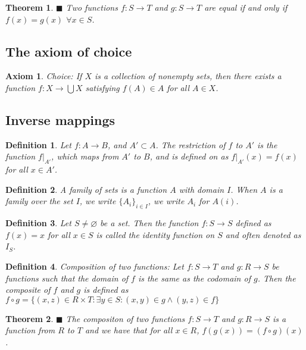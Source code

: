 \documentclass[a4paper]{article}
\newtheorem{mytheorem}{Theorem}
\newtheorem{axiom}{Axiom}
\newtheorem{mydef}{Definition}
\numberwithin{mytheorem}{section}
\numberwithin{mydef}{section}
\numberwithin{axiom}{section}
\numberwithin{example}{section}
\newcommand{\done}{$\blacksquare$ }
\begin{document}
\begin{mytheorem} \done Two functions $f: S \rightarrow T$ and $g: S \rightarrow T$ are equal if and only if $f(x) = g(x)$ $\forall x \in S$.
\end{mytheorem}


\subsection{The axiom of choice}

\begin{axiom} Choice:  If $X$ is a collection of nonempty sets, then there exists a function $f: X \rightarrow \bigcup X$ satisfying $f(A) \in A$ for all $A \in X$.
\end{axiom}

\subsection{Inverse mappings}

\begin{mydef} Let $f: A \rightarrow B$, and $A' \subset A$. The restriction of $f$ to $A'$ is the function $f|_{A'}$, which maps from $A'$ to $B$, and is defined on as $f|_{A'}(x) = f(x)$ for all $x \in A'$.
\end{mydef}

\begin{mydef} A family of sets is a function $A$ with domain $I$. When $A$ is a family over the set $I$, we write $\{A_{i}\}_{i \in I}$, we write $A_{i}$ for $A(i)$.
\end{mydef}

\begin{mydef} Let $S \neq \varnothing$ be a set. Then the function $f: S \rightarrow S$ defined as $f(x) = x$ for all $x \in S$ is called the identity function on $S$ and often denoted as $I_{S}$.
\end{mydef}

\begin{mydef} Composition of two functions: Let $f: S \rightarrow T$ and $g: R \rightarrow S$ be functions such that the domain of $f$ is the same as the codomain of $g$. Then the composite of $f$ and $g$ is defined as $f \circ g = \{ (x,z) \in R \times T : \exists y \in S : (x,y) \in g \wedge (y,z) \in f \} $
\end{mydef}

\begin{mytheorem} \done The compositon of two functions $f: S \rightarrow T$ and $g: R \rightarrow S$ is a function from $R$ to $T$ and we have that for all $x \in R$, $f(g(x)) = (f \circ g)(x)$.
\end{mytheorem}
\end{document}
